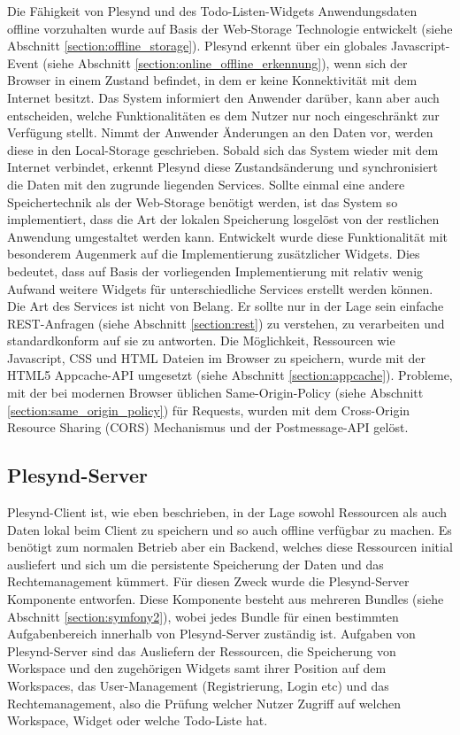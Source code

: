 Die Fähigkeit von Plesynd und des Todo-Listen-Widgets Anwendungsdaten offline vorzuhalten wurde auf Basis der Web-Storage Technologie entwickelt (siehe Abschnitt \ref{section:offline_storage}). Plesynd erkennt über ein globales Javascript-Event (siehe Abschnitt \ref{section:online_offline_erkennung}), wenn sich der Browser in einem Zustand befindet, in dem er keine Konnektivität mit dem Internet besitzt. Das System informiert den Anwender darüber, kann aber auch entscheiden, welche Funktionalitäten es dem Nutzer nur noch eingeschränkt zur Verfügung stellt. Nimmt der Anwender Änderungen an den Daten vor, werden diese in den Local-Storage geschrieben. Sobald sich das System wieder mit dem Internet verbindet, erkennt Plesynd diese Zustandsänderung und synchronisiert die Daten mit den zugrunde liegenden Services. Sollte einmal eine andere Speichertechnik als der Web-Storage benötigt werden, ist das System so implementiert, dass die Art der lokalen Speicherung losgelöst von der restlichen Anwendung umgestaltet werden kann. Entwickelt wurde diese Funktionalität mit besonderem Augenmerk auf die Implementierung zusätzlicher Widgets. Dies bedeutet, dass auf Basis der vorliegenden Implementierung mit relativ wenig Aufwand weitere Widgets für unterschiedliche Services erstellt werden können. Die Art des Services ist nicht von Belang. Er sollte nur in der Lage sein einfache REST-Anfragen (siehe Abschnitt \ref{section:rest}) zu verstehen, zu verarbeiten und standardkonform auf sie zu antworten. Die Möglichkeit, Ressourcen wie Javascript, CSS und HTML Dateien im Browser zu speichern, wurde mit der HTML5 Appcache-API umgesetzt (siehe Abschnitt \ref{section:appcache}). Probleme, mit der bei modernen Browser üblichen Same-Origin-Policy (siehe Abschnitt \ref{section:same_origin_policy}) für Requests, wurden mit dem Cross-Origin Resource Sharing (CORS) Mechanismus und der Postmessage-API gelöst. 

\subsection{Plesynd-Server}
Plesynd-Client ist, wie eben beschrieben, in der Lage sowohl Ressourcen als auch Daten lokal beim Client zu speichern und so auch offline verfügbar zu machen. Es benötigt zum normalen Betrieb aber ein Backend, welches diese Ressourcen initial ausliefert und sich um die persistente Speicherung der Daten und das Rechtemanagement kümmert. Für diesen Zweck wurde die Plesynd-Server Komponente entworfen. Diese Komponente besteht aus mehreren Bundles (siehe Abschnitt \ref{section:symfony2}), wobei jedes Bundle für einen bestimmten Aufgabenbereich innerhalb  von Plesynd-Server zuständig ist. Aufgaben von Plesynd-Server sind das Ausliefern der Ressourcen, die Speicherung von Workspace und den zugehörigen Widgets samt ihrer Position auf dem Workspaces, das User-Management (Registrierung, Login etc) und das Rechtemanagement, also die Prüfung welcher Nutzer Zugriff auf welchen Workspace, Widget oder welche Todo-Liste hat. 

